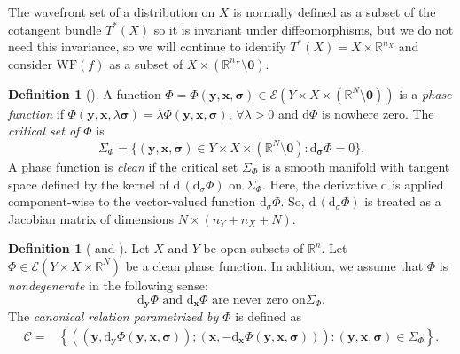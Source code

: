 \documentclass[a4paper,12pt]{amsart}
\numberwithin{equation}{section}
\theoremstyle{plain}
\numberwithin{theorem}{section}
\theoremstyle{definition}
\newtheorem{definition}[theorem]{Definition}
\theoremstyle{remark}
\theoremstyle{remark}
\theoremstyle{remark}
\newcommand{\smo}{\setminus \mathbf{0}}
\newcommand{\paren}[1]{\left(#1\right)}               %
\newcommand{\sparen}[1]{\left\{#1\right\}}      %
\newcommand{\dd}{\mathrm{d}}  %
\newcommand{\Cc}{\mathcal{C}}
\newcommand{\Ec}{\mathcal{E}}
\newcommand{\WF}{\mathrm{WF}}
\newcommand{\vx}{{\mathbf{x}}}
\newcommand{\vy}{{\mathbf{y}}}
\newcommand{\vs}{\mathbf{s}}
\newcommand{\vsig}{{\boldsymbol{\sigma}}} %
\newcommand{\rr}{{{\mathbb R}}}
\newcommand{\rn}{{{\mathbb R}^n}}
\begin{document}


The wavefront set of a distribution on $X$ is normally defined as a
subset of the cotangent bundle $T^*(X)$ so it is invariant under
diffeomorphisms, but we do not need this invariance, so we will
continue to identify $T^*(X) = X \times \rr^{n_X}$ and consider $\WF(f)$ as
a subset of $X\times (\rr^{n_X}\smo)$.



\begin{definition}[{\cite[Definition
        21.2.15]{hormanderIII}}] \label{phasedef}
A function $\Phi=\Phi(\vy,\vx,\vsig)\in
\Ec(Y\times X\times(\mathbb{R}^N\smo))$ is a \emph{phase
function} if $\Phi(\vy,\vx,\lambda\vsig)=\lambda\Phi(\vy,\vx,\vsig)$, $\forall
\lambda>0$ and $\mathrm{d}\Phi$ is nowhere zero. The
\emph{critical set of $\Phi$} is
\[\Sigma_\Phi=\{(\vy,\vx,\vsig)\in Y\times X\times(\mathbb{R}^N\smo)
: \dd_{\vsig}\Phi=0\}.\] 
 A phase function is
\emph{clean} if the critical set $\Sigma_\Phi$ is a smooth manifold {with tangent space defined {by} the kernel of $\mathrm{d}\,(\mathrm{d}_\sigma\Phi)$ on $\Sigma_\Phi$. Here, the derivative $\mathrm{d}$ is applied component-wise to the vector-valued function $\mathrm{d}_\sigma\Phi$. So, $\mathrm{d}\,(\mathrm{d}_\sigma\Phi)$ is treated as a Jacobian matrix of dimensions $N\times ({n_Y + n_X}+N)$.}
\end{definition}




\begin{definition}[{\cite[Definition 21.2.15]{hormanderIII} and
      \cite[section 25.2]{hormander}}]\label{def:canon} Let $X$ and
$Y$ be open subsets of $\rn$. Let $\Phi\in \Ec\paren{Y \times X \times
{\rr}^N}$ be a clean phase function.  In addition, we assume that
$\Phi$ is \emph{nondegenerate} in the following sense:
\[\text{$\dd_{\vy}\Phi$ and $\dd_{\vx}\Phi$ are never zero on
$\Sigma_{\Phi}$.}\]
  The
\emph{canonical relation parametrized by $\Phi$} is defined as
\begin{equation}\label{def:Cgenl} \begin{aligned} \Cc=&\sparen{
\paren{\paren{\vy,\dd_{\vy}\Phi(\vy,\vx,\vsig)};\paren{\vx,-\dd_{\vx}\Phi(\vy,\vx,\vsig)}}:(\vy,\vx,\vsig)\in
\Sigma_{\Phi}}{.}
\end{aligned}
\end{equation}
\end{definition}
\end{document}
